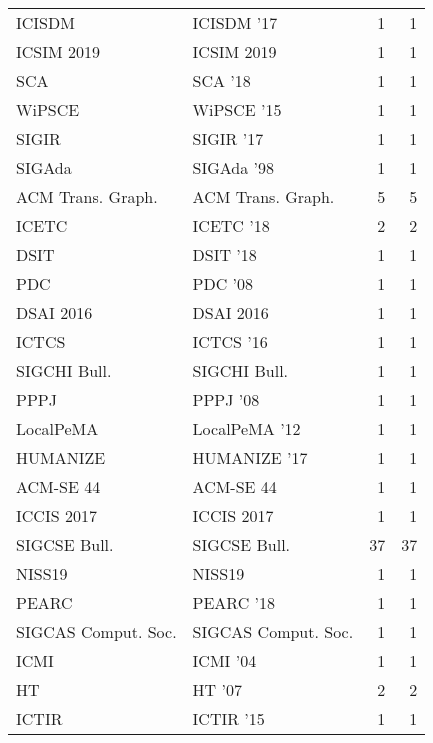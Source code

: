 \begin{table*}[t]
\begin{tabular}{llrr}
\multirow{1}{*}{ICISDM } & ICISDM '17 & 1 & \multirow{1}{*}{1}\\
\multirow{1}{*}{ICSIM 2019} & ICSIM 2019 & 1 & \multirow{1}{*}{1}\\
\multirow{1}{*}{SCA } & SCA '18 & 1 & \multirow{1}{*}{1}\\
\multirow{1}{*}{WiPSCE } & WiPSCE '15 & 1 & \multirow{1}{*}{1}\\
\multirow{1}{*}{SIGIR } & SIGIR '17 & 1 & \multirow{1}{*}{1}\\
\multirow{1}{*}{SIGAda } & SIGAda '98 & 1 & \multirow{1}{*}{1}\\
\multirow{1}{*}{ACM Trans. Graph.} & ACM Trans. Graph. & 5 & \multirow{1}{*}{5}\\
\multirow{1}{*}{ICETC } & ICETC '18 & 2 & \multirow{1}{*}{2}\\
\multirow{1}{*}{DSIT } & DSIT '18 & 1 & \multirow{1}{*}{1}\\
\multirow{1}{*}{PDC } & PDC '08 & 1 & \multirow{1}{*}{1}\\
\multirow{1}{*}{DSAI 2016} & DSAI 2016 & 1 & \multirow{1}{*}{1}\\
\multirow{1}{*}{ICTCS } & ICTCS '16 & 1 & \multirow{1}{*}{1}\\
\multirow{1}{*}{SIGCHI Bull.} & SIGCHI Bull. & 1 & \multirow{1}{*}{1}\\
\multirow{1}{*}{PPPJ } & PPPJ '08 & 1 & \multirow{1}{*}{1}\\
\multirow{1}{*}{LocalPeMA } & LocalPeMA '12 & 1 & \multirow{1}{*}{1}\\
\multirow{1}{*}{HUMANIZE } & HUMANIZE '17 & 1 & \multirow{1}{*}{1}\\
\multirow{1}{*}{ACM-SE 44} & ACM-SE 44 & 1 & \multirow{1}{*}{1}\\
\multirow{1}{*}{ICCIS 2017} & ICCIS 2017 & 1 & \multirow{1}{*}{1}\\
\multirow{1}{*}{SIGCSE Bull.} & SIGCSE Bull. & 37 & \multirow{1}{*}{37}\\
\multirow{1}{*}{NISS19} & NISS19 & 1 & \multirow{1}{*}{1}\\
\multirow{1}{*}{PEARC } & PEARC '18 & 1 & \multirow{1}{*}{1}\\
\multirow{1}{*}{SIGCAS Comput. Soc.} & SIGCAS Comput. Soc. & 1 & \multirow{1}{*}{1}\\
\multirow{1}{*}{ICMI } & ICMI '04 & 1 & \multirow{1}{*}{1}\\
\multirow{1}{*}{HT } & HT '07 & 2 & \multirow{1}{*}{2}\\
\multirow{1}{*}{ICTIR } & ICTIR '15 & 1 & \multirow{1}{*}{1}\\

\end{tabular}
\end{table*}
